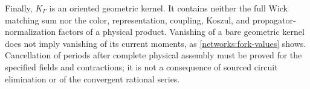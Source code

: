 Finally, $K_\Gamma$ is an oriented geometric kernel.  It contains neither
the full Wick matching sum nor the color, representation, coupling,
Koszul, and propagator-normalization factors of a physical product.
Vanishing of a bare geometric kernel does not imply vanishing of its
current moments, as \eqref{networks:fork-values} shows.  Cancellation of
periods after complete physical assembly must be proved for the specified
fields and contractions; it is not a consequence of sourced circuit
elimination or of the convergent rational series.
